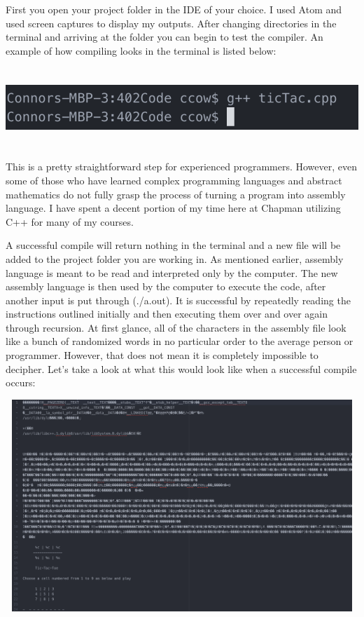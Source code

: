 \documentclass{article}
\theoremstyle{theorem}
\theoremstyle{definition}
\theoremstyle{remark}
\begin{document}
First you open your project folder in the IDE of your choice. I used Atom and used screen captures to display my outputs. After changing directories in the terminal and arriving at the folder you can begin to test the compiler. An example of how compiling looks in the terminal is listed below:

\medskip\begin{center}
\includegraphics[width=16cm, height=3cm]{Pic1.png}
\end{center}

This is a pretty straightforward step for experienced programmers. However, even some of those who have learned complex programming languages and abstract mathematics do not fully grasp the process of turning a program into assembly language. I have spent a decent portion of my time here at Chapman utilizing C++ for many of my courses. 

A successful compile will return nothing in the terminal and a new file will be added to the project folder you are working in. As mentioned earlier, assembly language is meant to be read and interpreted only by the computer. The new assembly language is then used by the computer to execute the code, after another input is put through (./a.out). It is successful by repeatedly reading the instructions outlined initially and then executing them over and over again through recursion. At first glance, all of the characters in the assembly file look like a bunch of randomized words in no particular order to the average person or programmer. However, that does not mean it is completely impossible to decipher. Let’s take a look at what this would look like when a successful compile occurs:

\medskip\begin{center}
\includegraphics[width=16cm, height=8cm]{Pic2.png}
\end{center}
\end{document}

